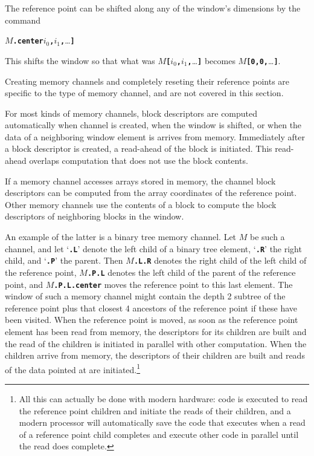 \documentclass[12pt]{article}
\makeatletter
\newcommand{\TT}[1]{{\tt \bfseries #1}}
\newcommand{\ttdkey}[1]{\TT{.#1}\index{#1@{\tt .#1}}}
\makeatother
\begin{document}
The reference point can be shifted along any of the window's
dimensions by the command
\begin{center}
$M$\ttdkey{center}\TT{[}$i_0$\TT{,}$i_1$\TT{,}\ldots\TT{]}
\end{center}
This shifts
the window so that what was
$M$\TT{[}$i_0$\TT{,}$i_1$\TT{,}\ldots\TT{]} becomes
$M$\TT{[0,0,}\ldots\TT{]}.

Creating memory channels and completely reseting their reference points
are specific to the type of memory channel, and are not covered in
this section.

For most kinds of memory channels, block descriptors are computed
automatically when channel is created, when the window is
shifted, or when the data of
a neighboring window element is arrives from memory.
Immediately after a block descriptor is created, a read-ahead of
the block is initiated.  This read-ahead overlaps computation that
does not use the block contents.

If a memory channel accesses arrays stored in memory,
the channel block descriptors can be computed from the array coordinates
of the reference point.  Other memory channels use the contents
of a block to compute the block descriptors of neighboring blocks
in the window.

An example of the latter is a binary tree memory channel.
Let $M$ be such a channel, and let `\TT{.L}' denote the left
child of a binary tree element, `\TT{.R}' the right child, and
`\TT{.P}' the parent.  Then $M\!$\TT{.L.R} denotes the right
child of the left child of the reference point, $M\!$\TT{.P.L}
denotes the left child of the parent of the reference point,
and $M\!$\TT{.P.L.center} moves the reference point to this last element.
The window of such a memory channel might contain the depth 2
subtree of the reference point plus that closest 4 ancestors of the
reference point if these have been visited.  When the reference
point is moved, as soon as the reference point element has been
read from memory, the descriptors for its children are built and
the read of the children is initiated in parallel with other
computation.  When the children arrive from memory, the descriptors
of their children are built and reads of the data pointed at
are initiated.\footnote{All this can actually be done with modern
hardware: code is executed to read the reference point children and initiate the
reads of their children, and a modern processor will automatically
save the code that
executes when a read of a reference point child completes and execute
other code in parallel until the read does complete.}
\end{document}
